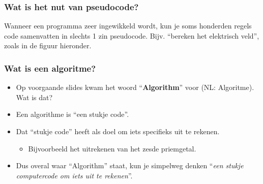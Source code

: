 \begin{frame}
\frametitle{Wat is het nut van pseudocode?}

Wanneer een programma zeer ingewikkeld wordt, kun je soms honderden regels code samenvatten in slechts 1 zin pseudocode.
Bijv. ``bereken het elektrisch veld'', zoals in de figuur hieronder.


\end{frame}


\begin{frame}
\frametitle{Wat is een algoritme?}

\begin{itemize}
  \item<1-> Op voorgaande slides kwam het woord ``\textbf{Algorithm}'' voor (NL: Algoritme). Wat is dat?
  \item<2-> Een algorithme is ``een stukje code''.
  \item<3-> Dat ``stukje code'' heeft als doel om iets specifieks uit te rekenen.
  \begin{itemize}
    \item<4-> Bijvoorbeeld het uitrekenen van het zesde priemgetal.
  \end{itemize}
  \item<5-> Dus overal waar ``Algorithm'' staat, kun je simpelweg denken ``\emph{een stukje computercode om iets uit te rekenen}''.
\end{itemize}

\end{frame}


